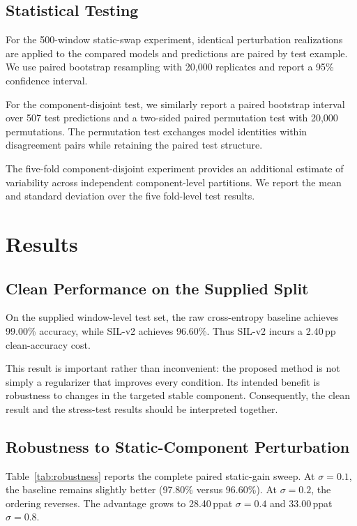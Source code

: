 \documentclass[runningheads]{llncs}
\newcommand{\method}{SIL-v2}
\newcommand{\pp}{\ensuremath{\,\mathrm{pp}}}
\begin{document}
\subsection{Statistical Testing}

For the 500-window static-swap experiment, identical perturbation realizations are applied to the compared models and predictions are paired by test example. We use paired bootstrap resampling with 20,000 replicates and report a 95\% confidence interval.

For the component-disjoint test, we similarly report a paired bootstrap interval over 507 test predictions and a two-sided paired permutation test with 20,000 permutations. The permutation test exchanges model identities within disagreement pairs while retaining the paired test structure.

The five-fold component-disjoint experiment provides an additional estimate of variability across independent component-level partitions. We report the mean and standard deviation over the five fold-level test results.

\section{Results}

\subsection{Clean Performance on the Supplied Split}

On the supplied window-level test set, the raw cross-entropy baseline achieves 99.00\% accuracy, while \method{} achieves 96.60\%. Thus \method{} incurs a 2.40\pp clean-accuracy cost.

This result is important rather than inconvenient: the proposed method is not simply a regularizer that improves every condition. Its intended benefit is robustness to changes in the targeted stable component. Consequently, the clean result and the stress-test results should be interpreted together.

\subsection{Robustness to Static-Component Perturbation}

Table~\ref{tab:robustness} reports the complete paired static-gain sweep. At $\sigma=0.1$, the baseline remains slightly better (97.80\% versus 96.60\%). At $\sigma=0.2$, the ordering reverses. The advantage grows to 28.40\pp at $\sigma=0.4$ and 33.00\pp at $\sigma=0.8$.
\end{document}
